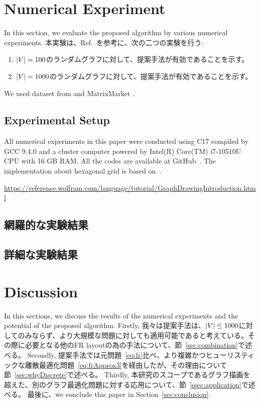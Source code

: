 \documentclass[dvipdfmx,lettersize,journal]{IEEEtran}
\newcommand{\Cpp}{C\nolinebreak[4]\hspace{-.05em}\raisebox{.4ex}{\relsize{-3}{\textbf{++}}}}
\begin{document}
\section{Numerical Experiment} \label{sec:experiment}

In this section, we evaluate the proposed algorithm by various numerical experiments.
本実験は、Ref.~\cite{8419285}を参考に、次の二つの実験を行う:
\begin{enumerate}
  \item $\abs{V} = 100$のランダムグラフに対して、提案手法が有効であることを示す。
  \item $\abs{V} = 1000$のランダムグラフに対して、提案手法が有効であることを示す。
\end{enumerate}
We used dataset from \cite{davis2011university} and MatrixMarket \cite{boisvertMatrixMarketWeb1997}.

\subsection{Experimental Setup}\label{ssec:setup}
All numerical experiments in this paper were conducted using \Cpp17
compiled by GCC 9.4.0 and a cluster computer powered by Intel(R) Core(TM) i7-10510U CPU with 16 GB RAM.
All the codes are available at GitHub~\cite{Hamaguchi_stabilizer_extent_2024}.
The implementation about hexagonal grid is based on~\cite{patelHexagonalGrids2013}.

\url{https://reference.wolfram.com/language/tutorial/GraphDrawingIntroduction.html}

\subsection{網羅的な実験結果}\label{ssec:exprAll}
\subsection{詳細な実験結果}\label{ssec:exprDetail}

\section{Discussion} \label{sec:discussion}

In this sections, we discuss the results of the numerical experiments and the potential of the proposed algorithm.
Firstly, 我々は提案手法は、$\abs{V} \leq 1000$に対してのみならず、より大規模な問題に対しても適用可能であると考えている。その際に必要となる他のFR layoutの為の手法について、節~\ref{sec:combination}で述べる。
Secondly, 提案手法では元問題~\eqref{eq:fr}比べ、より複雑かつヒューリスティックな離散最適化問題~\eqref{eq:frApprox3}を経由したが、その理由について節~\ref{sec:whyDiscrete}で述べる。
Thirdly, 本研究のスコープであるグラフ描画を超えた、別のグラフ最適化問題に対する応用について、節~\ref{ssec:application}で述べる。
最後に、we conclude this paper in Section~\ref{sec:conclusion}.
\end{document}
